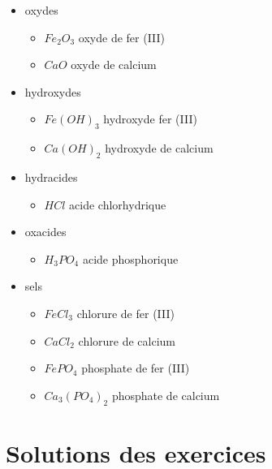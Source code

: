 \documentclass[
  11pt,
  a4paper,
  openany]{book}
\providecommand{\tightlist}{%
  \setlength{\itemsep}{0pt}\setlength{\parskip}{0pt}}
\begin{document}
\begin{Answer}

\begin{itemize}
\tightlist
\item
  oxydes

  \begin{itemize}
  \tightlist
  \item
    \(Fe_2O_3\) oxyde de fer (III)
  \item
    \(CaO\) oxyde de calcium
  \end{itemize}
\item
  hydroxydes

  \begin{itemize}
  \tightlist
  \item
    \(Fe(OH)_3\) hydroxyde fer (III)
  \item
    \(Ca(OH)_2\) hydroxyde de calcium
  \end{itemize}
\item
  hydracides

  \begin{itemize}
  \tightlist
  \item
    \(HCl\) acide chlorhydrique
  \end{itemize}
\item
  oxacides

  \begin{itemize}
  \tightlist
  \item
    \(H_3PO_4\) acide phosphorique
  \end{itemize}
\item
  sels

  \begin{itemize}
  \tightlist
  \item
    \(FeCl_3\) chlorure de fer (III)
  \item
    \(CaCl_2\) chlorure de calcium
  \item
    \(FePO_4\) phosphate de fer (III)
  \item
    \(Ca_3(PO_4)_2\) phosphate de calcium
  \end{itemize}
\end{itemize}

\end{Answer}

\newpage

\section{Solutions des exercices} \shipoutAnswer
\end{document}
